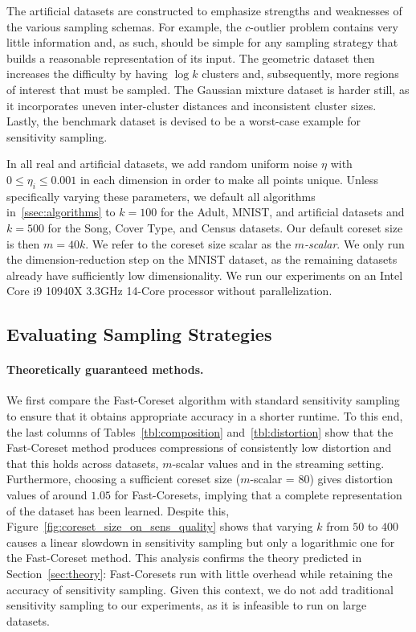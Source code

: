 The artificial datasets are constructed to emphasize strengths and weaknesses of the various sampling schemas. For example, the $c$-outlier problem contains
very little information and, as such, should be simple for any sampling strategy that builds a reasonable representation of its input. The geometric dataset
then increases the difficulty by having $\log k$ clusters and, subsequently, more regions of interest that must be sampled. The Gaussian mixture dataset is
harder still, as it incorporates uneven inter-cluster distances and inconsistent cluster sizes. Lastly, the benchmark dataset is devised to be a worst-case
example for sensitivity sampling.

In all real and artificial datasets, we add random uniform noise $\eta$ with $0 \leq \eta_i \leq 0.001$ in each dimension in order to make all points unique.
Unless specifically varying these parameters, we default all algorithms in~\ref{ssec:algorithms} to $k=100$ for the Adult, MNIST, and artificial datasets and
$k=500$ for the Song, Cover Type, and Census datasets. Our default coreset size is then $m = 40k$. We refer to the coreset size scalar as the \emph{$m$-scalar}.
We only run the dimension-reduction step on the MNIST dataset, as the remaining datasets already have sufficiently low dimensionality. We run our experiments on
an Intel Core i9 10940X 3.3GHz 14-Core processor without parallelization.

\subsection{Evaluating Sampling Strategies}
\label{ssec:alg_qualities}




\paragraph*{Theoretically guaranteed methods.}

We first compare the Fast-Coreset algorithm with standard sensitivity sampling to ensure that it obtains appropriate accuracy in a shorter runtime.  To this
end, the last columns of Tables~\ref{tbl:composition} and~\ref{tbl:distortion} show that the Fast-Coreset method produces compressions of consistently low
distortion and that this holds across datasets, $m$-scalar values and in the streaming setting. Furthermore, choosing a sufficient coreset size ($m$-scalar
= 80) gives distortion values of around $1.05$ for Fast-Coresets, implying that a complete representation of the dataset has been learned. Despite this,
Figure~\ref{fig:coreset_size_on_sens_quality} shows that varying $k$ from $50$ to $400$ causes a linear slowdown in sensitivity sampling but only a logarithmic
one for the Fast-Coreset method. This analysis confirms the theory predicted in Section~\ref{sec:theory}: Fast-Coresets run with little overhead while retaining
the accuracy of sensitivity sampling.  Given this context, we do not add traditional sensitivity sampling to our experiments, as it is infeasible to run on
large datasets.

